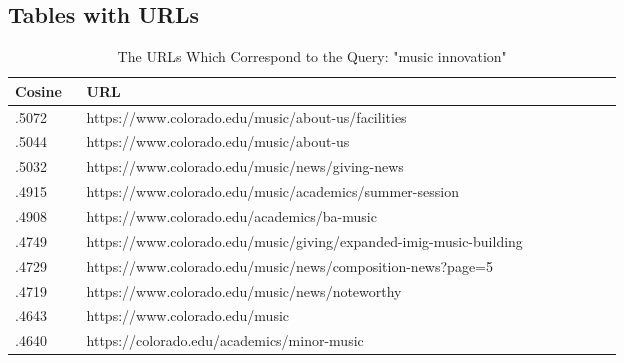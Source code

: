 \subsection{Tables with URLs}\label{subsec:tables}

\begin{table}[h]
\centering
\begin{tabular}{|p{0.1\linewidth} | p{0.75\linewidth}|}
\hline
\textbf{Cosine}  & \textbf{URL} \\ \hline
.5072         & https://www.colorado.edu/music/about-us/facilities \\ \hline
.5044         & https://www.colorado.edu/music/about-us \\ \hline
.5032        & https://www.colorado.edu/music/news/giving-news \\ \hline
.4915         & https://www.colorado.edu/music/academics/summer-session \\ \hline
.4908       & https://www.colorado.edu/academics/ba-music \\ \hline
.4749        & https://www.colorado.edu/music/giving/expanded-imig-music-building \\ \hline
.4729        & https://www.colorado.edu/music/news/composition-news?page=5 \\ \hline
.4719       & https://www.colorado.edu/music/news/noteworthy \\ \hline
.4643        & https://www.colorado.edu/music \\ \hline
.4640        & https://colorado.edu/academics/minor-music \\ \hline

\end{tabular}
\caption{The URLs Which Correspond to the Query: "music innovation"}
\label{table:querymusicappendix}
\end{table}

